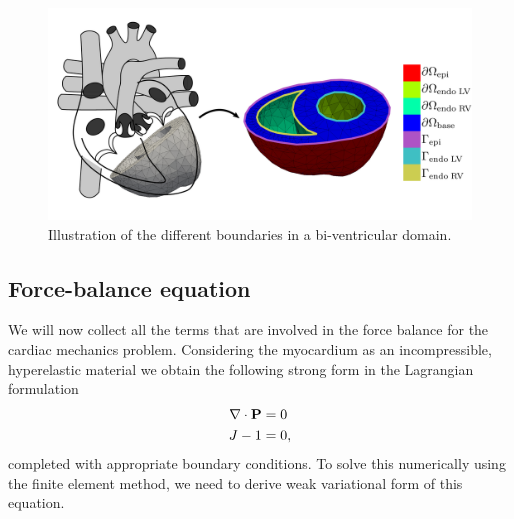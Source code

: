 \begin{figure}[htbp]
  \centering
    \includegraphics[width=\textwidth]{chapters/introduction/figures/boundaries}
\caption{Illustration of the different boundaries in a bi-ventricular
  domain.}
\label{fig:boundaries}
\end{figure}


\subsection{Force-balance equation}
We will now collect all the terms that are involved in the force balance for
the cardiac mechanics problem. Considering the myocardium as an incompressible,
hyperelastic material we obtain the following strong form in the
Lagrangian formulation 
\begin{align}
  \begin{split}
  \nabla \cdot \mathbf{P} &= 0 \\
  J - 1 &= 0,
  \end{split}
 \label{eq:force_balance_strong}
\end{align}
completed with appropriate boundary conditions. To solve this
numerically using the finite element method, we need to derive weak
variational form of this equation.
 


